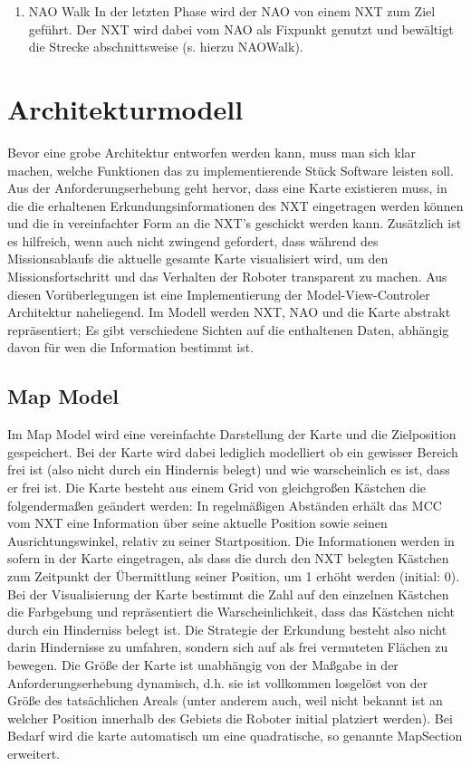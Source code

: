 \begin{enumerate}
\item NAO Walk
In der letzten Phase wird der NAO von einem NXT zum Ziel geführt. Der NXT wird dabei vom NAO als Fixpunkt genutzt und bewältigt die Strecke abschnittsweise (s. hierzu NAOWalk).
\end{enumerate}

\section{Architekturmodell}
Bevor eine grobe Architektur entworfen werden kann, muss man sich klar machen, welche Funktionen das zu implementierende Stück Software leisten soll. Aus der Anforderungserhebung geht hervor, dass eine Karte existieren muss, in die die erhaltenen Erkundungsinformationen des NXT eingetragen werden können und die in vereinfachter Form an die NXT's geschickt werden kann. Zusätzlich ist es hilfreich, wenn auch nicht zwingend gefordert, dass während des Missionsablaufs die aktuelle gesamte Karte visualisiert wird, um den Missionsfortschritt und das Verhalten der Roboter transparent zu machen.
Aus diesen Vorüberlegungen ist eine Implementierung der Model-View-Controler Architektur naheliegend. Im Modell werden NXT, NAO und die Karte abstrakt repräsentiert; Es gibt verschiedene Sichten auf die enthaltenen Daten, abhängig davon für wen die Information bestimmt ist.

\subsection{Map Model}
Im Map Model wird eine vereinfachte Darstellung der Karte und die Zielposition gespeichert. Bei der Karte wird dabei lediglich modelliert ob ein gewisser Bereich frei ist (also nicht durch ein Hindernis belegt) und wie warscheinlich es ist, dass er frei ist. Die Karte besteht aus einem Grid von gleichgroßen Kästchen die folgendermaßen geändert werden: In regelmäßigen Abständen erhält das MCC vom NXT eine Information über seine aktuelle Position sowie seinen Ausrichtungswinkel, relativ zu seiner Startposition. Die Informationen werden in sofern in der Karte eingetragen, als dass die durch den NXT belegten Kästchen zum Zeitpunkt der Übermittlung seiner Position, um 1 erhöht werden (initial: 0). Bei der Visualisierung der Karte bestimmt die Zahl auf den einzelnen Kästchen die Farbgebung und repräsentiert die Warscheinlichkeit, dass das Kästchen nicht durch ein Hinderniss belegt ist. Die Strategie der Erkundung besteht also nicht darin Hindernisse zu umfahren, sondern sich auf als frei vermuteten Flächen zu bewegen. Die Größe der Karte ist unabhängig von der Maßgabe in der Anforderungserhebung dynamisch, d.h. sie ist vollkommen losgelöst von der Größe des tatsächlichen Areals (unter anderem auch, weil nicht bekannt ist an welcher Position innerhalb des Gebiets die Roboter initial platziert werden). Bei Bedarf wird die karte automatisch um eine quadratische, so genannte MapSection erweitert.

